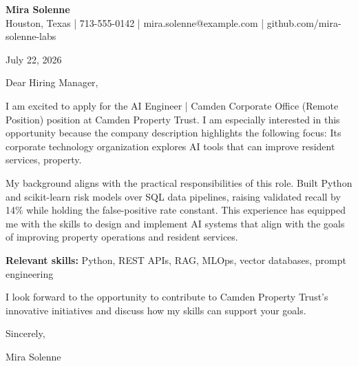 \documentclass[11pt]{article}
\begin{document}
\begin{center}
{\Large\bfseries Mira Solenne}\\
Houston, Texas | 713-555-0142 | mira.solenne@example.com | github.com/mira-solenne-labs
\end{center}

July 22, 2026

Dear Hiring Manager,

I am excited to apply for the AI Engineer | Camden Corporate Office (Remote Position) position at Camden Property Trust. I am especially interested in this opportunity because the company description highlights the following focus: Its corporate technology organization explores AI tools that can improve resident services, property.

My background aligns with the practical responsibilities of this role. Built Python and scikit-learn risk models over SQL data pipelines, raising validated recall by 14\% while holding the false-positive rate constant. This experience has equipped me with the skills to design and implement AI systems that align with the goals of improving property operations and resident services.

\textbf{Relevant skills:} Python, REST APIs, RAG, MLOps, vector databases, prompt engineering

I look forward to the opportunity to contribute to Camden Property Trust's innovative initiatives and discuss how my skills can support your goals.

Sincerely,

Mira Solenne
\end{document}
